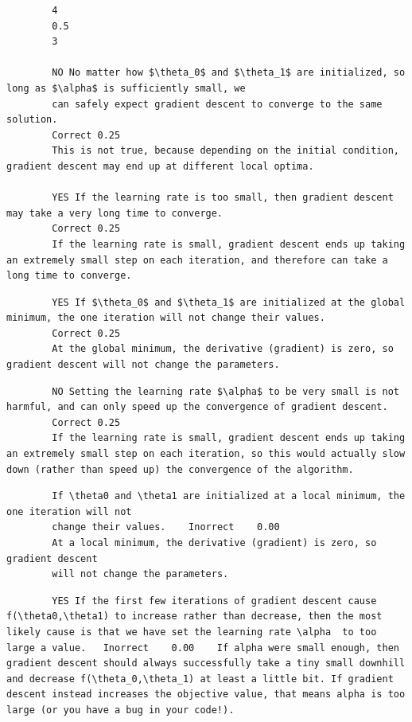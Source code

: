 	
	
	
	
	\newpage
		
		
		
		
		\begin{verbatim}
		4
		0.5
		3
		
		NO No matter how $\theta_0$ and $\theta_1$ are initialized, so long as $\alpha$ is sufficiently small, we 
		can safely expect gradient descent to converge to the same solution.	
		Correct	0.25	
		This is not true, because depending on the initial condition, gradient descent may end up at different local optima.
		
		YES If the learning rate is too small, then gradient descent may take a very long time to converge.	
		Correct	0.25	
		If the learning rate is small, gradient descent ends up taking an extremely small step on each iteration, and therefore can take a long time to converge.
		\end{verbatim}
		
		\begin{verbatim}
		YES If $\theta_0$ and $\theta_1$ are initialized at the global minimum, the one iteration will not change their values.	
		Correct	0.25	
		At the global minimum, the derivative (gradient) is zero, so gradient descent will not change the parameters.
		\end{verbatim}
		
		\begin{verbatim}
		NO Setting the learning rate $\alpha$ to be very small is not harmful, and can only speed up the convergence of gradient descent.	
		Correct	0.25	
		If the learning rate is small, gradient descent ends up taking an extremely small step on each iteration, so this would actually slow down (rather than speed up) the convergence of the algorithm.
		\end{verbatim}
		
		\begin{verbatim}
		If \theta0 and \theta1 are initialized at a local minimum, the one iteration will not 
		change their values.	Inorrect	0.00	
		At a local minimum, the derivative (gradient) is zero, so gradient descent 
		will not change the parameters.
		\end{verbatim}
		
		\begin{verbatim}
		YES If the first few iterations of gradient descent cause f(\theta0,\theta1) to increase rather than decrease, then the most likely cause is that we have set the learning rate \alpha  to too large a value.	Inorrect	0.00	If alpha were small enough, then gradient descent should always successfully take a tiny small downhill and decrease f(\theta_0,\theta_1) at least a little bit. If gradient descent instead increases the objective value, that means alpha is too large (or you have a bug in your code!).
		\end{verbatim}
		
